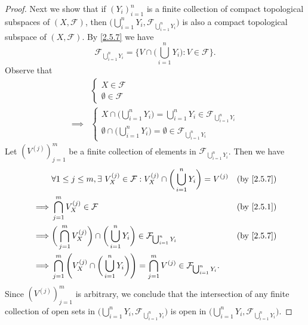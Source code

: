 \begin{proof}
  Next we show that if \((Y_i)_{i = 1}^n\) is a finite collection of compact topological subspaces of \((X, \mathcal{F})\), then \(\big(\bigcup_{i = 1}^n Y_i, \mathcal{F}_{\bigcup_{i = 1}^n Y_i}\big)\) is also a compact topological subspace of \((X, \mathcal{F})\).
  By \cref{2.5.7} we have
  \[
    \mathcal{F}_{\bigcup_{i = 1}^n Y_i} = \bigg\{V \cap \bigg(\bigcup_{i = 1}^n Y_i\bigg) : V \in \mathcal{F}\bigg\}.
  \]
  Observe that
  \begin{align*}
             & \begin{cases}
                 X \in \mathcal{F} \\
                 \emptyset \in \mathcal{F}
               \end{cases}                                                                                 \\
    \implies & \begin{cases}
                 X \cap \bigg(\bigcup_{i = 1}^n Y_i\bigg) = \bigcup_{i = 1}^n Y_i \in \mathcal{F}_{\bigcup_{i = 1}^n Y_i} \\
                 \emptyset \cap \bigg(\bigcup_{i = 1}^n Y_i\bigg) = \emptyset \in \mathcal{F}_{\bigcup_{i = 1}^n Y_i}
               \end{cases}
  \end{align*}
  Let \((V^{(j)})_{j = 1}^m\) be a finite collection of elements in \(\mathcal{F}_{\bigcup_{i = 1}^n Y_i}\).
  Then we have
  \begin{align*}
             & \forall 1 \leq j \leq m, \exists\ V_X^{(j)} \in \mathcal{F} : V_X^{(j)} \cap \bigg(\bigcup_{i = 1}^n Y_i\bigg) = V^{(j)}                            & \text{(by \cref{2.5.7})} \\
    \implies & \bigcap_{j = 1}^m V_X^{(j)} \in \mathcal{F}                                                                                                         & \text{(by \cref{2.5.1})} \\
    \implies & \bigg(\bigcap_{j = 1}^m V_X^{(j)}\bigg) \cap \bigg(\bigcup_{i = 1}^n Y_i\bigg) \in \mathcal{F}_{\bigcup_{i = 1}^n Y_i}                              & \text{(by \cref{2.5.7})} \\
    \implies & \bigcap_{j = 1}^m \Bigg(V_X^{(j)} \cap \bigg(\bigcup_{i = 1}^n Y_i\bigg)\Bigg) = \bigcap_{j = 1}^m V^{(j)} \in \mathcal{F}_{\bigcup_{i = 1}^n Y_i}.
  \end{align*}
  Since \((V^{(j)})_{j = 1}^m\) is arbitrary, we conclude that the intersection of any finite collection of open sets in \(\big(\bigcup_{i = 1}^n Y_i, \mathcal{F}_{\bigcup_{i = 1}^n Y_i}\big)\) is open in \(\big(\bigcup_{i = 1}^n Y_i, \mathcal{F}_{\bigcup_{i = 1}^n Y_i}\big)\).

\end{proof}
